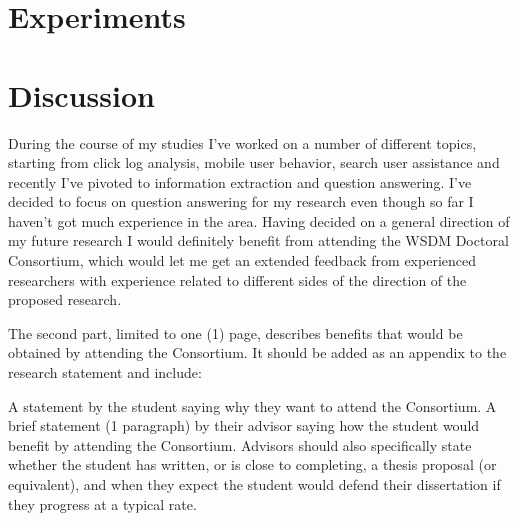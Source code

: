 \documentclass{sig-alternate}
\begin{document}
\section{Experiments}


\section{Discussion}


%

%
%
\appendix
During the course of my studies I've worked on a number of different topics, starting from click log analysis, mobile user behavior, search user assistance and recently I've pivoted to information extraction and question answering.
I've decided to focus on question answering for my research even though so far I haven't got much experience in the area.
Having decided on a general direction of my future research I would definitely benefit from attending the WSDM Doctoral Consortium, which would let me get an extended feedback from experienced researchers with experience related to different sides of the direction of the proposed research.




The second part, limited to one (1) page, describes benefits that would be obtained by attending the Consortium. It should be added as an appendix to the research statement and include:

A statement by the student saying why they want to attend the Consortium.
A brief statement (1 paragraph) by their advisor saying how the student would benefit by attending the Consortium. Advisors should also specifically state whether the student has written, or is close to completing, a thesis proposal (or equivalent), and when they expect the student would defend their dissertation if they progress at a typical rate.
\end{document}
